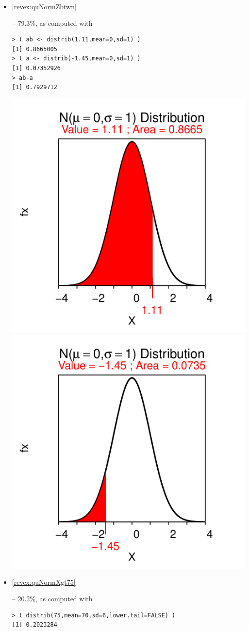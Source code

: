 \documentclass[10pt,openany]{book}\usepackage[]{graphicx}\usepackage[]{color}
\makeatletter
\newenvironment{kframe}{%
 \def\at@end@of@kframe{}%
 \ifinner\ifhmode%
  \def\at@end@of@kframe{\end{minipage}}%
  \begin{minipage}{\columnwidth}%
 \fi\fi%
 \def\FrameCommand##1{\hskip\@totalleftmargin \hskip-\fboxsep
 \colorbox{shadecolor}{##1}\hskip-\fboxsep
     \hskip-\linewidth \hskip-\@totalleftmargin \hskip\columnwidth}%
 \MakeFramed {\advance\hsize-\width
   \@totalleftmargin\z@ \linewidth\hsize
   \@setminipage}}%
 {\par\unskip\endMakeFramed%
 \at@end@of@kframe}
\newenvironment{knitrout}{}{} %
\makeatother
\begin{document}
\begin{itemize}
\begin{knitrout}
\end{knitrout}
  \item \hypertarget{ans:quNormZbtwn}{\ref{revex:quNormZbtwn}} -- 79.3\%, as computed with
\begin{knitrout}
\color{fgcolor}\begin{kframe}
\begin{verbatim}
> ( ab <- distrib(1.11,mean=0,sd=1) )
[1] 0.8665005
> ( a <- distrib(-1.45,mean=0,sd=1) )
[1] 0.07352926
> ab-a
[1] 0.7929712
\end{verbatim}
\end{kframe}

{\centering \includegraphics[width=.4\linewidth]{Figs/unnamed-chunk-217-1} 
\includegraphics[width=.4\linewidth]{Figs/unnamed-chunk-217-2} 

}



\end{knitrout}
  \item \hypertarget{ans:quNormXgt75}{\ref{revex:quNormXgt75}} -- 20.2\%, as computed with
\begin{knitrout}
\color{fgcolor}\begin{kframe}
\begin{verbatim}
> ( distrib(75,mean=70,sd=6,lower.tail=FALSE) )
[1] 0.2023284
\end{verbatim}
\end{kframe}


\end{knitrout}
\end{itemize}
\end{document}
